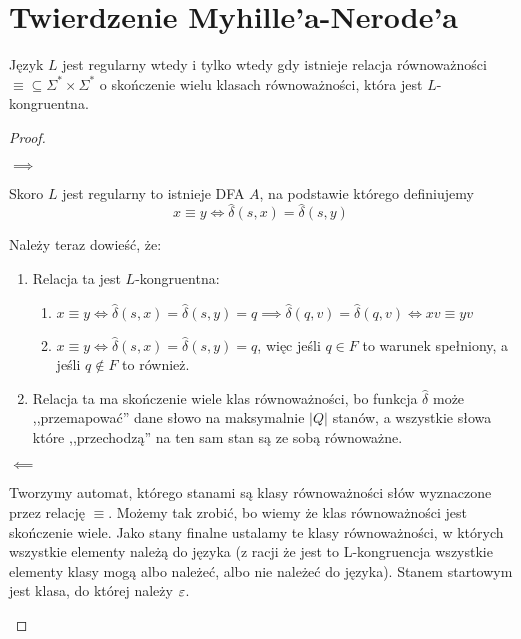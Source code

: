 \section{Twierdzenie Myhille'a-Nerode'a}

\begin{theorem}
	Język \( L \) jest regularny wtedy i tylko wtedy gdy
	istnieje relacja równoważności \( \equiv \subseteq \Sigma^* \times \Sigma^*\) o skończenie wielu klasach równoważności, która jest \(L\)-kongruentna.
\end{theorem}
\begin{proof} \( \)
	\begin{description}
		\item \( \implies \)

		      Skoro \( L \) jest regularny to istnieje DFA \( A \), na podstawie którego definiujemy
		      \[
			      x \equiv y \iff \hat \delta(s, x) = \hat \delta(s, y)
		      \]

		      Należy teraz dowieść, że:

		      \begin{enumerate}
			      \item Relacja ta jest \(L\)-kongruentna: \begin{enumerate}
				            \item \(x \equiv y \iff \hat \delta(s, x) = \hat \delta(s, y) = q \implies  \hat \delta(q, v) = \hat \delta(q, v) \iff xv \equiv yv\)
				            \item \(x \equiv y \iff \hat \delta(s, x) = \hat \delta(s, y) = q \), więc jeśli \(q \in F\) to warunek spełniony, a jeśli \(q \not \in F\) to również.

			            \end{enumerate}

			      \item Relacja ta ma skończenie wiele klas równoważności, bo funkcja \( \hat \delta \) może ,,przemapować'' dane słowo na maksymalnie \( |Q| \) stanów, a wszystkie słowa które ,,przechodzą'' na ten sam stan są ze sobą równoważne.

		      \end{enumerate}

		\item \( \impliedby \)

		      Tworzymy automat, którego stanami są klasy równoważności słów wyznaczone przez relację \( \equiv \). Możemy tak zrobić, bo wiemy że klas równoważności jest skończenie wiele. Jako stany finalne ustalamy te klasy równoważności, w których wszystkie elementy należą do języka (z racji że jest to L-kongruencja wszystkie elementy klasy mogą albo należeć, albo nie należeć do języka). Stanem startowym jest klasa, do której należy \( \varepsilon \).


\end{description}
\end{proof}
